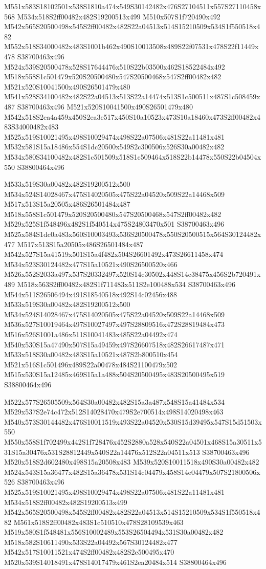 \documentclass{article}
\begin{document}
\begin{multicols}{2}
M551x583S18102501x538S1810a474x549S30142482x476S27104511x557S27110458x568 M534x518S2ff00482x482S19200513x499 M510x507S1f720490x492 M542x565S20500498x545S2ff00482x482S22a04513x514S15210509x534S1f550518x482 M552x518S34000482x483S1001b462x490S10013508x489S22f07531x478S22f11449x478 S38700463x496 M524x539S20500478x528S17644476x510S22b03500x462S18522484x492 M518x558S1c501479x520S20500480x547S20500468x547S2ff00482x482 M521x520S10041500x490S26501479x480 M541x528S34100482x482S22a04513x513S22a14474x513S1c500511x487S1c508459x487 S38700463x496 M521x520S10041500x490S26501479x480 M542x518S2ea4a459x450S2ea3e517x450S10a10523x473S10a18460x473S2ff00482x483S34000482x483 M525x519S10021495x498S10029474x498S22a07506x481S22a11481x481 M532x581S15a18486x554S1dc20500x549S2c300506x526S30a00482x482 M534x580S34100482x482S1c501509x518S1c509464x518S22b14478x550S22b04504x550 S38800464x496

M533x519S30a00482x482S19200512x500 M534x524S14028467x475S14020505x475S22a04520x509S22a14468x509 M517x513S15a20505x486S26501484x487 M518x558S1c501479x520S20500480x547S20500468x547S2ff00482x482 M529x525S1f548496x482S1f540514x475S24803470x501 S38700463x496 M525x584S1dc0a483x560S10003493x536S20500478x550S20500515x564S30124482x477 M517x513S15a20505x486S26501484x487 M542x527S15a41519x501S15a4f482x504S26601492x473S26611458x474 M534x523S30124482x477S15a10521x490S26500520x466 M526x552S2033a497x537S20332497x520S14c30502x448S14c38475x456S2b720491x489 M518x563S2ff00482x482S1f711483x511S2e100488x534 S38700463x496 M544x511S26506494x491S18540518x492S14c02456x488 M533x519S30a00482x482S19200512x500 M534x524S14028467x475S14020505x475S22a04520x509S22a14468x509 M536x527S10019464x497S10027497x497S28809516x472S28819484x473 M516x526S1001a486x511S10041483x485S22a04492x474 M540x530S15a47490x507S15a49459x497S26607518x482S26617487x471 M533x518S30a00482x483S15a10521x487S2b800510x454 M521x516S1c501496x489S22a00478x484S21100479x502 M515x530S15a12485x469S15a1a488x504S20500495x483S20500495x519 S38800464x496

M522x577S26505509x564S30a00482x482S15a3a487x548S15a41484x534 M529x537S2e74c472x512S14028470x479S2e700514x498S14020498x463 M540x573S30144482x476S10011519x493S22a04520x530S15d39495x547S15d51503x550 M550x558S1f702499x442S1f728476x452S2880a528x540S22a04501x468S15a30511x531S15a30476x531S28812449x540S22a14476x512S22a04511x513 S38700463x496 M520x518S2d602480x498S15a20508x483 M539x520S10011518x490S30a00482x482 M524x543S15a36477x482S15a36478x531S14c04479x458S14e04479x507S21800506x526 S38700463x496 M525x519S10021495x498S10029474x498S22a07506x481S22a11481x481 M534x518S2ff00482x482S19200513x499 M542x565S20500498x545S2ff00482x482S22a04513x514S15210509x534S1f550518x482 M561x518S2ff00482x483S1c510510x478S28109539x463 M519x580S1f548481x556S10002489x553S26504494x531S30a00482x482 M518x582S10611490x533S22a04492x567S30124482x477 M542x517S10011521x474S2ff00482x482S2e500495x470 M520x539S14018491x478S14017479x461S2ea20484x514 S38800464x496


\end{multicols}
\end{document}
